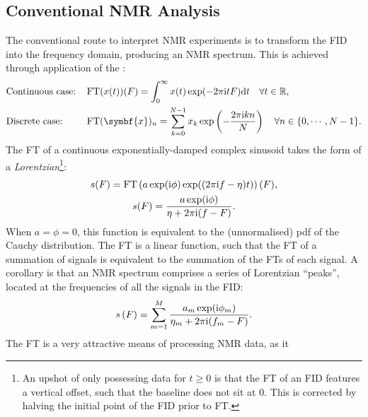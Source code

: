 \subsection{Conventional NMR Analysis}
\label{subsec:nmr-analysis}
The conventional route to interpret \ac{NMR} experiments is to
transform the \ac{FID} into the frequency domain, producing an
\ac{NMR} spectrum. This is achieved through application of the :
\begin{subequations}
    \begin{align}
        &\text{Continuous case:} &&\FT(x(t))(F) =  \int_{0}^{\infty} x(t) \exp(
            -2 \pi \iu t F
            ) \mathrm{d} t
            \quad \forall t \in \mathbb{R},\\
        &\text{Discrete case:} &&\FT( \symbf{x} )_n =  \sum_{k=0}^{N-1} x_k \exp \left(
            -\frac{2 \pi \iu k n}{N} \right)
            \quad \forall n \in \lbrace 0, \cdots, N-1 \rbrace.
    \end{align}
\end{subequations}
The \ac{FT} of a continuous exponentially-damped complex sinusoid
takes the form of a \emph{Lorentzian}\footnote{
    An upshot of only possessing data for $t \geq 0$ is
    that the \ac{FT} of an \ac{FID} features a vertical offset,
    such that the baseline does not sit at 0\cite{Tang1994}. This is corrected
    by halving the initial point of the \ac{FID} prior to \ac{FT}.
}:
\begin{subequations}
    \begin{gather}
        s(F) = \operatorname{FT}\left(
            a \exp(\mathrm{i} \phi) \exp((2 \pi \mathrm{i} f - \eta)t)
            \right)(F),\\
        s(F) = \frac{a \exp(\mathrm{i} \phi) }
            {\eta + 2 \pi \mathrm{i} (f - F)}.
    \end{gather}
\end{subequations}
When $a = \phi = 0$, this function is equivalent to the (unnormalised) \ac{pdf}
of the Cauchy distribution. The \ac{FT} is a linear function, such that the
\ac{FT} of a summation of signals is equivalent to the summation of the
\acp{FT} of each signal. A corollary is that an \ac{NMR} spectrum comprises a
series of Lorentzian ``peaks'', located at the frequencies of all the signals
in the \ac{FID}:
\begin{equation}
    s\left(F\right) = \sum_{m=1}^{M}
    \frac{a_m \exp(\mathrm{i} \phi_m)}
    {\eta_m + 2 \pi \mathrm{i} (f_m - F)}.
    \label{eq:ft-summation}
\end{equation}
The \ac{FT} is a very attractive means of processing \ac{NMR} data, as it

